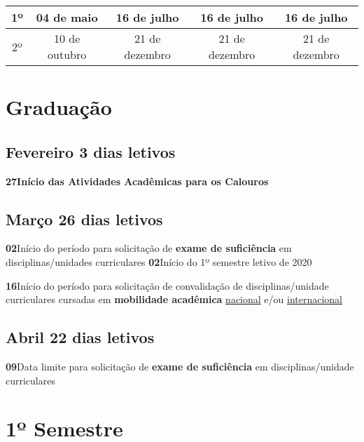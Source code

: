 \documentclass[thesis]{hmcposter}
\begin{document}
\begin{poster}
\begin{center}
\begin{table}
{\begin{tabular}{|c|c|c|c|c|}
1º & 04 de maio & 16 de julho & 16 de julho & 16 de julho \\ \hline
2º & 10 de outubro & 21 de dezembro & 21 de dezembro & 21 de dezembro \\ \hline
\end{tabular}
}
\end{table}
\newline
\null
\newline
\end{center}
\vfill
\null
\newpage\section{\color{hmcorange}Graduação}\subsection{Fevereiro \hfill 3 dias letivos}\textbf{27}\qquad \textbf{Início das Atividades Acadêmicas para os Calouros} \subsection{Março \hfill 26 dias letivos}\textbf{02}\qquad Início do período para solicitação de \textbf{exame de suficiência} em disciplinas/unidades curriculares \newline\textbf{02}\qquad Início do 1º semestre letivo de 2020

 \newline\textbf{16}\qquad Início do período para solicitação de convalidação de disciplinas/unidade curriculares cursadas em \textbf{mobilidade acadêmica} \underline{nacional} e/ou \underline{internacional} \subsection{Abril \hfill 22 dias letivos}\textbf{09}\qquad Data limite para solicitação de \textbf{exame de suficiência} em disciplinas/unidade curriculares \vfill\null
\columnbreak
\section{\hfill \color{hmcorange}1º Semestre}

\end{poster}
\end{document}
